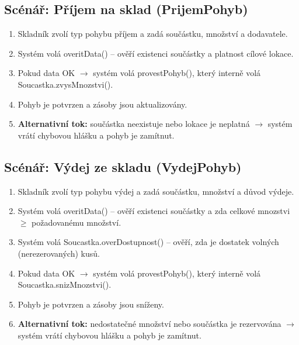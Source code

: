\subsection{Scénář: Příjem na sklad (PrijemPohyb)}
\begin{enumerate}
  \item Skladník zvolí typ pohybu příjem a zadá součástku, množství a dodavatele.
  \item Systém volá overitData() -- ověří existenci součástky a platnost cílové lokace.
  \item Pokud data OK $\rightarrow$ systém volá provestPohyb(), který interně volá Soucastka.zvysMnozstvi().
  \item Pohyb je potvrzen a zásoby jsou aktualizovány.
  \item \textbf{Alternativní tok:} součástka neexistuje nebo lokace je neplatná $\rightarrow$ systém vrátí chybovou hlášku a pohyb je zamítnut.
\end{enumerate}

\subsection{Scénář: Výdej ze skladu (VydejPohyb)}
\begin{enumerate}
  \item Skladník zvolí typ pohybu výdej a zadá součástku, množství a důvod výdeje.
  \item Systém volá overitData() -- ověří existenci součástky a zda celkové mnozstvi $\geq$ požadovanému množství.
  \item Systém volá Soucastka.overDostupnost() -- ověří, zda je dostatek volných (nerezerovaných) kusů.
  \item Pokud data OK $\rightarrow$ systém volá provestPohyb(), který interně volá Soucastka.snizMnozstvi().
  \item Pohyb je potvrzen a zásoby jsou sníženy.
  \item \textbf{Alternativní tok:} nedostatečné množství nebo součástka je rezervována $\rightarrow$ systém vrátí chybovou hlášku a pohyb je zamítnut.
\end{enumerate}

